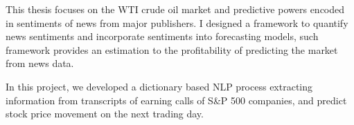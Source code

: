 \documentclass[letterpaper]{deedy-resume} %
\begin{document}
\begin{minipage}[t]{0.66\textwidth}
\sectionspace %
 

\small {This thesis focuses on the WTI crude oil market and predictive powers encoded in sentiments of news from major publishers. I designed a framework to quantify news sentiments and incorporate sentiments into forecasting models, such framework provides an estimation to the profitability of predicting the market from news data.}

\sectionspace %


\small {In this project, we developed a dictionary based NLP process extracting information from transcripts of earning calls of S\&P 500 companies, and predict stock price movement on the next trading day.}

\sectionspace %

%

%
%



%


\end{minipage}
\end{document}
